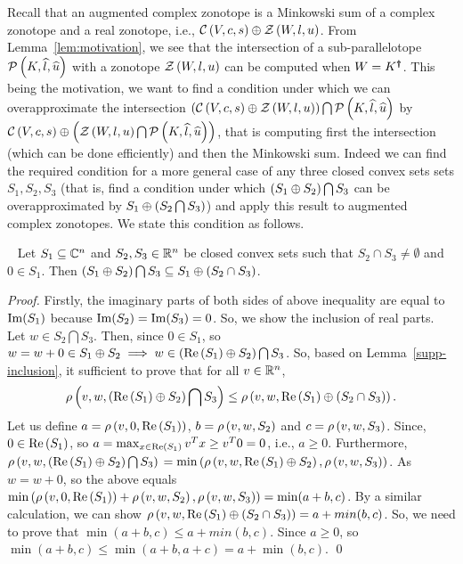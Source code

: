 Recall that an augmented complex zonotope is a Minkowski sum of a
complex zonotope and a real zonotope, i.e.,
$\cz{V}{c}{s}\oplus\zon{W}{l}{u}$.  From Lemma~\ref{lem:motivation},
we see that the intersection of a sub-parallelotope
$\sptope{K}{\wh{l}}{\wh{u}}$ with a zonotope $\zon{W}{l}{u}$ can be
computed when $W=\pinv{K}$.  This being the motivation, we want to
find a condition under which we can overapproximate the intersection
$\lt(\cz{V}{c}{s}\oplus\zon{W}{l}{u}\rt)\bigcap\sptope{K}{\wh{l}}{\wh{u}}$
by
$\cz{V}{c}{s}\oplus\lt(\zon{W}{l}{u}\bigcap\sptope{K}{\wh{l}}{\wh{u}}\rt)$,
that is computing first the intersection (which can be done
efficiently) and then the Minkowski sum.  Indeed we can find the
required condition for a more general case of any three closed convex
sets sets $S_1,S_2,S_3$ (that is, find a condition under which
$\lt(S_1\oplus S_2\rt)\bigcap S_3$ can be overapproximated by
$S_1\oplus\lt(S_2\bigcap S_3\rt)$) and apply this result to augmented
complex zonotopes. We state this condition as follows.
%
\begin{lemma}~\label{gen-int}
Let $S_1\subseteq \complexset^n$ and $S_2,S_3\in\realset^n$ be closed
convex sets such that $S_2\cap S_3\neq \emptyset$ and $0\in S_1$.
Then $\lt(S_1\oplus S_2\rt)\bigcap S_3\subseteq S_1\oplus\lt(S_2\cap
S_3\rt)$.
\end{lemma}
\begin{proof}
Firstly, the imaginary parts of both sides of above inequality are
equal to $\img(S_1)$ because $\img(S_2)=\img(S_3)=0$. So, we show the
inclusion of real parts.  Let $w\in S_2\bigcap S_3 $.  Then, since
$0\in S_1$, so $w=w+0\in S_1\oplus S_2\imp w\in
\lt(\real\lt(S_1\rt)\oplus S_2\rt)\bigcap S_3$.  So, based on
Lemma~\ref{supp-inclusion}, it sufficient to prove that for all
$v\in\realset^n$, $$\support{w}{v}{\lt(\real\lt(S_1\rt)\oplus
  S_2\rt)\bigcap S_3}\leq
\support{w}{v}{\real\lt(S_1\rt)\oplus\lt(S_2\cap S_3\rt)}.$$ Let us
define $a = \support{0}{v}{\real\lt(S_1\rt)}$, $b=\support{w}{v}{S_2}$
and $c = \support{w}{v}{S_3}$.  Since, $0\in\real\lt(S_1\rt)$, so
$a=\max_{x\in\real\lt(S_1\rt)}v^Tx\geq v^T0 =0$, i.e., $a\geq 0$.
Furthermore, $\support{w}{v}{\lt(\real\lt(S_1\rt)\oplus S_2\rt)\bigcap
  S_3}$ $= \min\lt(\support{w}{v}{\real\lt(S_1\rt)\oplus
  S_2},\support{w}{v}{S_3}\rt)$.  As $w=w+0$, so the above equals
$\min\lt(\support{0}{v}{\real\lt(S_1\rt)}+\support{w}{v}{S_2},\support{w}{v}{S_3}\rt)
= \min(a+b,c)$.  By a similar calculation, we can show
$\support{w}{v}{\real\lt(S_1\rt)\oplus\lt(S_2\cap S_3\rt)} =
a+min(b,c)$.  So, we need to prove that $\min(a+b,c)\leq a+min(b,c)$.
Since $a\geq 0$, so $\min(a+b,c)\leq \min(a+b,a+c) =
a+\min(b,c)$. \qed
\end{proof}

